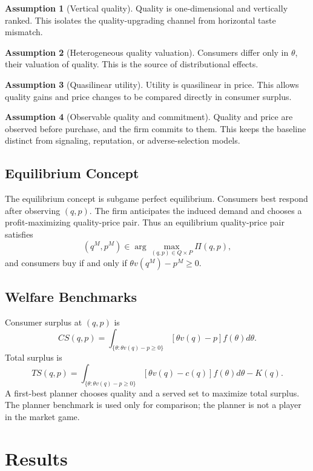 \documentclass[12pt]{article}
\theoremstyle{plain}
\theoremstyle{definition}
\newtheorem{assumption}{Assumption}
\theoremstyle{remark}
\begin{document}
\begin{assumption}[Vertical quality]
Quality is one-dimensional and vertically ranked. This isolates the quality-upgrading channel from horizontal taste mismatch.
\end{assumption}

\begin{assumption}[Heterogeneous quality valuation]
Consumers differ only in $\theta$, their valuation of quality. This is the source of distributional effects.
\end{assumption}

\begin{assumption}[Quasilinear utility]
Utility is quasilinear in price. This allows quality gains and price changes to be compared directly in consumer surplus.
\end{assumption}

\begin{assumption}[Observable quality and commitment]
Quality and price are observed before purchase, and the firm commits to them. This keeps the baseline distinct from signaling, reputation, or adverse-selection models.
\end{assumption}

\subsection{Equilibrium Concept}

The equilibrium concept is subgame perfect equilibrium. Consumers best respond after observing $(q,p)$. The firm anticipates the induced demand and chooses a profit-maximizing quality-price pair. Thus an equilibrium quality-price pair satisfies
\[
 (q^M,p^M)\in\arg\max_{(q,p)\in Q\times P}\Pi(q,p),
\]
and consumers buy if and only if $\theta v(q^M)-p^M\geq 0$.

\subsection{Welfare Benchmarks}

Consumer surplus at $(q,p)$ is
\[
 CS(q,p)=\int_{\{\theta:\theta v(q)-p\geq 0\}}[\theta v(q)-p]f(\theta)d\theta.
\]
Total surplus is
\[
 TS(q,p)=\int_{\{\theta:\theta v(q)-p\geq 0\}}[\theta v(q)-c(q)]f(\theta)d\theta-K(q).
\]
A first-best planner chooses quality and a served set to maximize total surplus. The planner benchmark is used only for comparison; the planner is not a player in the market game.

\section{Results}
\end{document}
